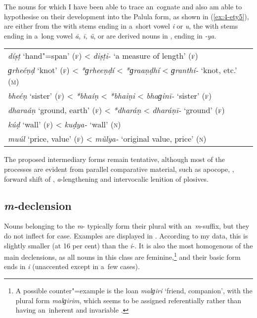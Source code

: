 The nouns for which I have been able to trace an~\iliOIA cognate and also am able to hypothesise on their development into the Palula form, as shown in (\ref{ex:4-ety5}), are either from the \iliOIA {} with stems ending in a~short vowel \textit{i} or \textit{u}, the  with stems ending in a~long vowel \textit{ā, ī, ũ}, or are derived nouns in \iliOIA, ending in \textit{-ya}.


\begin{exe}
\extab
\label{ex:4-ety5}
\begin{tabular}{ l }
\textit{díṣṭ} `hand"=span' (\textsc{f}) {\textless} \textit{diṣṭi-} `a measure of length' (\textsc{f})\\
\textit{ɡrheéṇḍ} `knot' (\textsc{f}) {\textless} \textit{*ɡrheeṇḍí} {\textless} \textit{*ɡraaṇḍhí} {\textless} \textit{ɡranthí-} `knot, etc.' (\textsc{m})\\
\textit{bheéṇ} `sister' (\textsc{f}) {\textless} \textit{*bhaíṇ} {\textless} \textit{*bhaiṇi} {\textless} \textit{bhaɡinī-} `sister' (\textsc{f})\\
\textit{dharaáṇ} `ground, earth' (\textsc{f}) {\textless} \textit{*dharáṇ} {\textless} \textit{dharáṇī-} `ground' (\textsc{f})\\
\textit{kúḍ} `wall' (\textsc{f}) {\textless} \textit{kuḍya-} `wall' (\textsc{n})\\
\textit{muúl} `price, value' (\textsc{f}) {\textless} \textit{mũlya-} `original value, price' (\textsc{n})
\end{tabular}
\end{exe}


The proposed intermediary forms remain tentative, although most of the processes are evident from parallel comparative material, such as apocope, , forward shift of , \textit{a}-lengthening and intervocalic lenition of plosives.

\subsection{\textit{m-}declension}
\label{subsec:4-6-3}

Nouns belonging to the \textit{m}- typically form their plural with an~\textit{m}-suffix, but they do not inflect for  case. Examples are displayed in . According to my data, this  is slightly smaller (at 16 per cent) than the \textit{i}-. It is also the most homogenous of the main declensions, as all nouns in this class are feminine,\footnote{A possible counter"=example is the \iliPashto loan \textit{malɡiri} `friend, companion', with the plural form \textit{malɡirim}, which seems to be assigned  referentially rather than having an~inherent and invariable .} and their basic form ends in \textit{i} (unaccented except in a~few cases).


